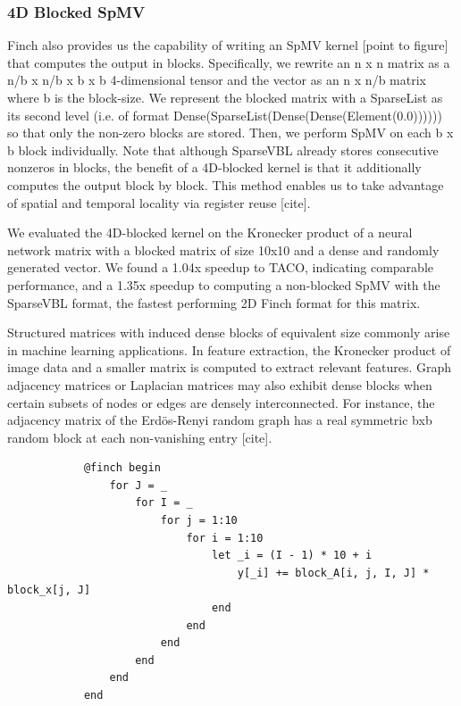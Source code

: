 \subsubsection{4D Blocked SpMV}
Finch also provides us the capability of writing an SpMV kernel [point to figure] that computes the output in blocks. Specifically, we rewrite an n x n matrix as a n/b x n/b x b x b 4-dimensional tensor and the vector as an n x n/b matrix where b is the block-size. We represent the blocked matrix with a SparseList as its second level (i.e. of format Dense(SparseList(Dense(Dense(Element(0.0)))))) so that only the non-zero blocks are stored. Then, we perform SpMV on each b x b block individually. Note that although SparseVBL already stores consecutive nonzeros in blocks, the benefit of a 4D-blocked kernel is that it additionally computes the output block by block. This method enables us to take advantage of spatial and temporal locality via register reuse [cite].

We evaluated the 4D-blocked kernel on the Kronecker product of a neural network matrix with a blocked matrix of size 10x10 and a dense and randomly generated vector. We found a 1.04x speedup to TACO, indicating comparable performance, and a 1.35x speedup to computing a non-blocked SpMV with the SparseVBL format, the fastest performing 2D Finch format for this matrix. 

Structured matrices with induced dense blocks of equivalent size commonly arise in machine learning applications. In feature extraction, the Kronecker product of image data and a smaller matrix is computed to extract relevant features. Graph adjacency matrices or Laplacian matrices may also exhibit dense blocks when certain subsets of nodes or edges are densely interconnected. For instance, the adjacency matrix of the Erdös-Renyi random graph has a real symmetric bxb random block at each non-vanishing entry [cite]. 

\begin{verbatim}
            @finch begin
                for J = _
                    for I = _
                        for j = 1:10
                            for i = 1:10
                                let _i = (I - 1) * 10 + i
                                    y[_i] += block_A[i, j, I, J] * block_x[j, J]
                                end
                            end
                        end
                    end
                end
            end
\end{verbatim}


